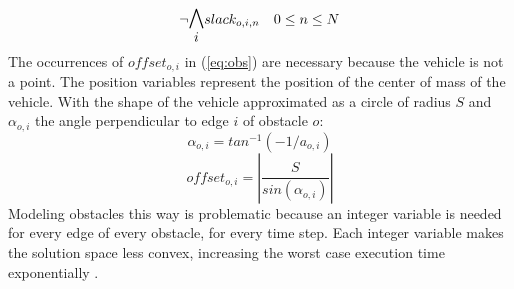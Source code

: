 \begin{equation}
\neg \mathlarger{\mathlarger{\bigwedge_{i}}} slack_{o,i,n} \quad 0 \leq n \leq N
\end{equation}
The occurrences of $offset_{o,i}$ in (\ref{eq:obs}) are necessary because the vehicle is not a point. The position variables represent the position of the center of mass of the vehicle. With the shape of the vehicle approximated as a circle of radius $S$ and $\alpha_{o,i}$ the angle perpendicular to edge $i$ of obstacle $o$:
\begin{equation}
\alpha_{o,i} = tan^{-1}( -1 / a_{o,i})
\end{equation}
\begin{equation}
offset_{o,i} = |\dfrac{S}{sin(\alpha_{o,i})}|
\end{equation}
Modeling obstacles this way is problematic because an integer variable is needed for every edge of every obstacle, for every time step. Each integer variable makes the solution space less convex, increasing the worst case execution time exponentially \cite{DBLP:conf/coco/Karp72}.